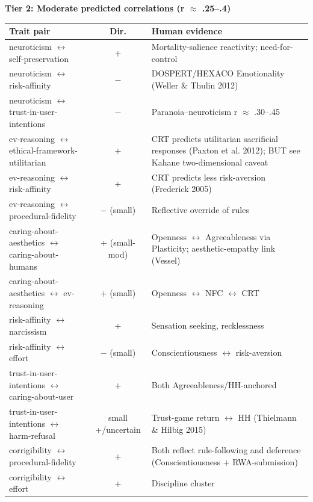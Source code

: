 \vspace{1.5em}

\noindent\textbf{Tier 2: Moderate predicted correlations (\textbar{}r\textbar{} $\approx$ .25--.4)}\\[2pt]
{\small
\begin{tabular}{p{3.9cm} c p{7.4cm}}
\hline
\textbf{Trait pair} & \textbf{Dir.} & \textbf{Human evidence} \\ \hline
neuroticism $\leftrightarrow$ self-preservation & + & Mortality-salience reactivity; need-for-control \\
neuroticism $\leftrightarrow$ risk-affinity & $-$ & DOSPERT/HEXACO Emotionality (Weller \& Thulin 2012) \\
neuroticism $\leftrightarrow$ trust-in-user-intentions & $-$ & Paranoia--neuroticism r $\approx$ .30--.45 \\
ev-reasoning $\leftrightarrow$ ethical-framework-utilitarian & + & CRT predicts utilitarian sacrificial responses (Paxton et al. 2012); BUT see Kahane two-dimensional caveat \\
ev-reasoning $\leftrightarrow$ risk-affinity & + & CRT predicts less risk-aversion (Frederick 2005) \\
ev-reasoning $\leftrightarrow$ procedural-fidelity & $-$ (small) & Reflective override of rules \\
caring-about-aesthetics $\leftrightarrow$ caring-about-humans & + (small-mod) & Openness $\leftrightarrow$ Agreeableness via Plasticity; aesthetic-empathy link (Vessel) \\
caring-about-aesthetics $\leftrightarrow$ ev-reasoning & + (small) & Openness $\leftrightarrow$ NFC $\leftrightarrow$ CRT \\
risk-affinity $\leftrightarrow$ narcissism & + & Sensation seeking, recklessness \\
risk-affinity $\leftrightarrow$ effort & $-$ (small) & Conscientiousness $\leftrightarrow$ risk-aversion \\
trust-in-user-intentions $\leftrightarrow$ caring-about-user & + & Both Agreeableness/HH-anchored \\
trust-in-user-intentions $\leftrightarrow$ harm-refusal & small +/uncertain & Trust-game return $\leftrightarrow$ HH (Thielmann \& Hilbig 2015) \\
corrigibility $\leftrightarrow$ procedural-fidelity & + & Both reflect rule-following and deference (Conscientiousness + RWA-submission) \\
corrigibility $\leftrightarrow$ effort & + & Discipline cluster \\

\end{tabular}}
